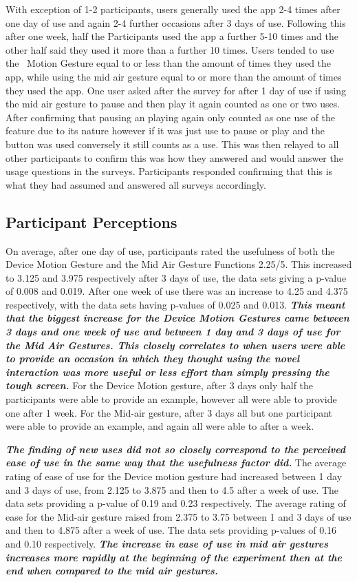 \documentclass{l4proj}
\begin{document}
With exception of 1-2 participants, users generally used the app 2-4 times after one day of use and again 2-4 further occasions after 3 days of use. Following this after one week, half the Participants used the app a further 5-10 times and the other half said they used it more than a further 10 times. Users tended to use the  Motion Gesture equal to or less than the amount of times they used the app, while using the mid air gesture equal to or more than the amount of times they used the app. One user asked after the survey for after 1 day of use if using the mid air gesture to pause and then play it again counted as one or two uses. After confirming that pausing an playing again only counted as one use of the feature due to its nature however if it was just use to pause or play and the button was used conversely it still counts as a use. This was then relayed to all other participants to confirm this was how they answered and would answer the usage questions in the surveys. Participants responded confirming that this is what they had assumed and answered all surveys accordingly.

\subsection{Participant Perceptions}

On average, after one day of use, participants rated the usefulness of both the Device Motion Gesture and the Mid Air Gesture Functions 2.25/5. This increased to 3.125 and 3.975 respectively after 3 days of use, the data sets giving a p-value of 0.008 and 0.019. After one week of use there was an increase to 4.25 and 4.375 respectively, with the data sets having p-values of 0.025 and 0.013.  \textbf{\textit{This meant that the biggest increase for the Device Motion Gestures came between 3 days and one week of use and between 1 day and 3 days of use for the Mid Air Gestures. This closely correlates to when users were able to provide an occasion in which they thought using the novel interaction was more useful or less effort than simply pressing the tough screen.}} For the Device Motion gesture, after 3 days only half the participants were able to provide an example, however all were able to provide one after 1 week. For the Mid-air gesture, after 3 days all but one participant were able to provide an example, and again all were able to after a week.

\textbf{\textit{The finding of new uses did not so closely correspond to the perceived ease of use in the same way that the usefulness factor did.}} The average rating of ease of use for the Device motion gesture had increased between 1 day and 3 days of use, from 2.125 to 3.875 and then to 4.5 after a week of use. The data sets providing a p-value of 0.19 and 0.23 respectively. The average rating of ease for the Mid-air gesture raised from 2.375 to 3.75 between 1 and 3 days of use and then to 4.875 after a week of use. The data sets providing p-values of 0.16 and 0.10 respectively.  \textbf{\textit{The increase in ease of use in mid air gestures increases more rapidly at the beginning of the experiment then at the end when compared to the mid air gestures.}}
\end{document}
